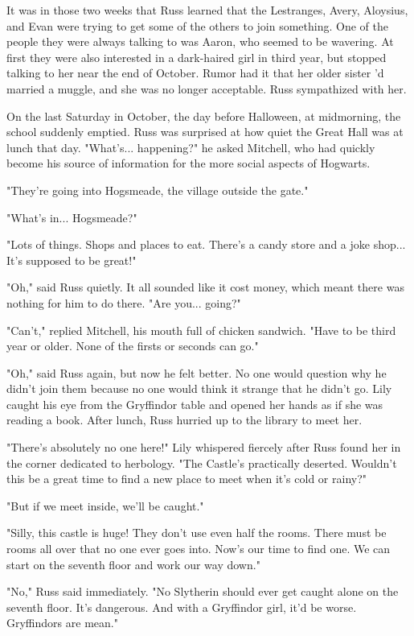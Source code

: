 \documentclass[a4paper,11pt]{article}
\begin{document}
It was in those two weeks that Russ learned that the Lestranges, Avery, Aloysius, and Evan were trying to get some of the others to join something. One of the people they were always talking to was Aaron, who seemed to be wavering. At first they were also interested in a dark-haired girl in third year, but stopped talking to her near the end of October. Rumor had it that her older sister 'd married a muggle, and she was no longer acceptable. Russ sympathized with her.

On the last Saturday in October, the day before Halloween, at midmorning, the school suddenly emptied. Russ was surprised at how quiet the Great Hall was at lunch that day. "What's... happening?" he asked Mitchell, who had quickly become his source of information for the more social aspects of Hogwarts.

"They're going into Hogsmeade, the village outside the gate."

"What's in... Hogsmeade?"

"Lots of things. Shops and places to eat. There's a candy store and a joke shop... It's supposed to be great!"

"Oh," said Russ quietly. It all sounded like it cost money, which meant there was nothing for him to do there. "Are you... going?"

"Can't," replied Mitchell, his mouth full of chicken sandwich. "Have to be third year or older. None of the firsts or seconds can go."

"Oh," said Russ again, but now he felt better. No one would question why he didn't join them because no one would think it strange that he didn't go. Lily caught his eye from the Gryffindor table and opened her hands as if she was reading a book. After lunch, Russ hurried up to the library to meet her.

"There's absolutely no one here!" Lily whispered fiercely after Russ found her in the corner dedicated to herbology. "The Castle's practically deserted. Wouldn't this be a great time to find a new place to meet when it's cold or rainy?"

"But if we meet inside, we'll be caught."

"Silly, this castle is huge! They don't use even half the rooms. There must be rooms all over that no one ever goes into. Now's our time to find one. We can start on the seventh floor and work our way down."

"No," Russ said immediately. "No Slytherin should ever get caught alone on the seventh floor. It's dangerous. And with a Gryffindor girl, it'd be worse. Gryffindors are mean."
\end{document}
